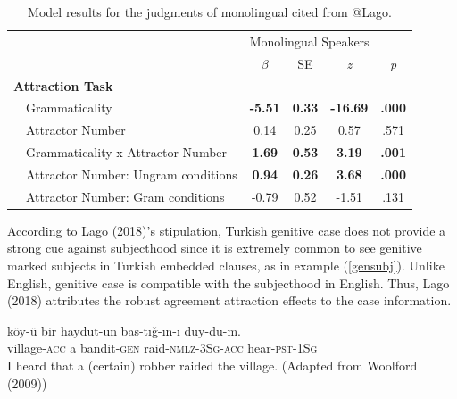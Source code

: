 \documentclass[11pt,a4paper]{article}
\begin{document}
\begin{table}[!hbt]
\centering
\begin{tabular}{llcccc}
\hline
    &                                        & \multicolumn{4}{l}{Monolingual Speakers}                                               \\ \cline{3-6} 
    &                                        & $\beta$        & SE            & \emph{z} & \emph{p} \\ \hline
\multicolumn{2}{l}{\textbf{Attraction Task}} &                &               &                           &                           \\
    & Grammaticality                         & \textbf{-5.51} & \textbf{0.33} & \textbf{-16.69}           & \textbf{.000}             \\
    & Attractor Number                       & 0.14           & 0.25          & 0.57                      & .571                      \\
    & Grammaticality x Attractor Number      & \textbf{1.69}  & \textbf{0.53} & \textbf{3.19}             & \textbf{.001}             \\
    & Attractor Number: Ungram conditions    & \textbf{0.94}  & \textbf{0.26} & \textbf{3.68}             & \textbf{.000}             \\
    & Attractor Number: Gram conditions      & -0.79          & 0.52          & -1.51                     & .131                      \\ \hline
\end{tabular}
\caption{Model results for the judgments of monolingual cited from @Lago.}
\label{lagomodel}
\end{table}

According to Lago (2018)'s stipulation, Turkish genitive case does not
provide a strong cue against subjecthood since it is extremely common to
see genitive marked subjects in Turkish embedded clauses, as in example
(\ref{gensubj}). Unlike English, genitive case is compatible with the
subjecthood in English. Thus, Lago (2018) attributes the robust
agreement attraction effects to the case information.

\begin{exe}
\ex \label{gensubj}
\gll k\"{o}y-\"{u} bir haydut-un bas-t{\i}\u{g}-{\i}n-{\i} duy-du-m.\\
village-\textsc{acc} a bandit-\textsc{gen} raid-\textsc{nmlz}-\textsc{3Sg}-\textsc{acc} hear-\textsc{pst}-\textsc{1Sg}\\
\glt I heard that a (certain) robber raided the village. (Adapted from Woolford (2009))
\end{exe}
\end{document}
